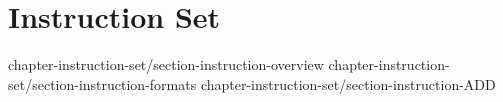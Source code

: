 %
%
\chapter*{Instruction Set}



 {chapter-instruction-set/section-instruction-overview}
 {chapter-instruction-set/section-instruction-formats}
  {chapter-instruction-set/section-instruction-ADD}
